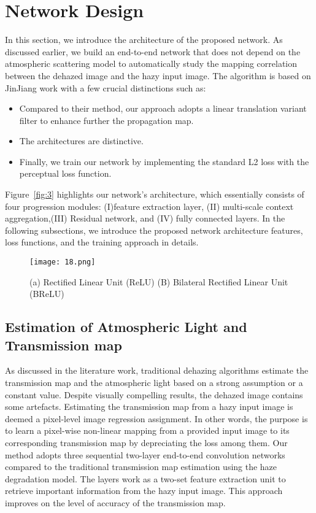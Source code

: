 \documentclass[doctor,english,listoffigures,listoftables]{thesis-uestc}
\begin{document}
\section{Network Design} \label{3}
In this section, we introduce the architecture of the proposed network. As discussed earlier, we build an end-to-end network that does not depend on the atmospheric scattering model to automatically study the mapping correlation between the dehazed image and the hazy input image. The algorithm is based on JinJiang work with a few crucial distinctions such as:
\begin{itemize}
    \item Compared to their method, our approach adopts a linear translation variant filter to enhance further the propagation map.
    \item  The architectures are distinctive.
	\item Finally, we train our network by implementing the standard L2 loss with the perceptual loss function. 	
\end{itemize}
Figure~\ref{fig:3} highlights our network's architecture, which essentially consists of four progression modules: (I)feature extraction layer, (II) multi-scale context aggregation,(III) Residual network, and (IV) fully connected layers. In the following subsections, we introduce the proposed network architecture features, loss functions, and the training approach in details.
\begin{figure}[H]
\texttt{[image: 18.png]}
\caption{(a) Rectified Linear Unit (ReLU) (B) Bilateral Rectified Linear Unit (BReLU)}
\label{fig:4}
\end{figure} 

\subsection{Estimation of Atmospheric Light and Transmission map}
As discussed in the literature work, traditional dehazing algorithms estimate the transmission map and the atmospheric light based on a strong assumption or a constant value. Despite visually compelling results, the dehazed image contains some artefacts. Estimating the transmission map from a hazy input image is deemed a pixel-level image regression assignment. In other words, the purpose is to learn a pixel-wise non-linear mapping from a provided input image to its corresponding transmission map by depreciating the loss among them. Our method adopts three sequential two-layer end-to-end convolution networks compared to the traditional transmission map estimation using the haze degradation model. The layers work as a two-set feature extraction unit to retrieve important information from the hazy input image.  This approach improves on the level of accuracy of the transmission map. 
\end{document}
